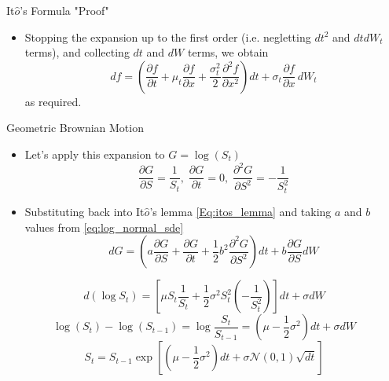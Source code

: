 \documentclass{beamer}
\begin{document}
\begin{frame}{It$\hat{o}$'s Formula "Proof"}
	\begin{itemize}
	\item Stopping the expansion up to the first order (i.e. negletting $dt^2$ and $dt dW_t$ terms), and collecting $dt$ and $dW$ terms, we obtain
	\begin{equation*}
	df=\left({\frac {\partial f}{\partial t}}+\mu _{t}{\frac {\partial f}{\partial x}}+{\frac {\sigma _{t}^{2}}{2}}{\frac {\partial ^{2}f}{\partial x^{2}}}\right)dt+\sigma _{t}{\frac {\partial f}{\partial x}}\,dW_{t}
	\end{equation*}
	as required.
\end{itemize}
\end{frame}

\begin{frame}{Geometric Brownian Motion}
	\begin{itemize}
		\item<0-> Let's apply this expansion to $G=\log(S_t)$ 
		\begin{equation*}
			\frac{\partial G}{\partial S}=\frac{1}{S_t},\;\frac{\partial G}{\partial t}=0,\;\frac{\partial^2 G}{\partial S^2}=-\frac{1}{S_t^2}
		\end{equation*}
		\item<2-> Substituting back into It$\hat{o}$'s lemma \cref{Eq:itos_lemma} and taking $a$ and $b$ values from \cref{eq:log_normal_sde}
		\begin{equation*}
			dG = \left(a\frac{\partial G}{\partial S} + \frac{\partial G}{\partial t} + \frac{1}{2}b^2\frac{\partial^2 G}{\partial S^2}\right)dt + b\frac{\partial G}{\partial S} dW
		\end{equation*}
	\end{itemize}
	\pause
	\pause
	\begin{equation*}
	d(\log S_t) = \left[\mu S_t\frac{1}{S_t} + \frac{1}{2}\sigma^2S_t^2\left(-\frac{1}{S_t^2}\right)\right]dt + \sigma dW
	\end{equation*}
	\pause
	\begin{equation*}
	\log(S_t) - \log(S_{t-1}) = \log\frac{S_t}{S_{t-1}}=\left(\mu - \frac{1}{2}\sigma^2\right)dt + \sigma dW 
	\end{equation*}	
	\pause
	\begin{equation}
	S_t = S_{t-1}\exp\left[\left(\mu-\frac{1}{2}\sigma^2\right)dt + \sigma\mathcal{N}(0,1)\sqrt{dt}\right] 
	\label{eq:lognormal_solution}
	\end{equation}
\end{frame}
\end{document}
